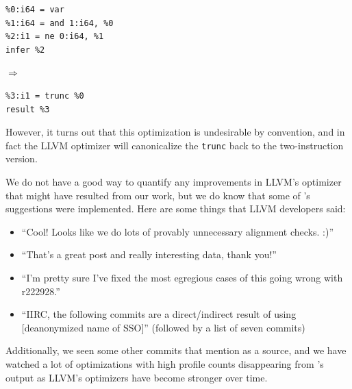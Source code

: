 {\small\begin{verbatim}
%0:i64 = var
%1:i64 = and 1:i64, %0
%2:i1 = ne 0:i64, %1
infer %2
\end{verbatim}}
$\Rightarrow$
{\small\begin{verbatim}
%3:i1 = trunc %0
result %3
\end{verbatim}}

However, it turns out that this optimization is undesirable by
convention, and in fact the LLVM optimizer will canonicalize the
\texttt{trunc} back to the two-instruction version.


We do not have a good way to quantify any improvements in LLVM's
optimizer that might have resulted from our work, but we do know that
some of \tool{}'s suggestions were implemented.
%
Here are some things that LLVM developers said:
\begin{itemize}
\item
  ``Cool! Looks like we do lots of provably unnecessary alignment checks. :)''
\item
  ``That’s a great post and really interesting data, thank you!''
\item
  ``I’m pretty sure I’ve fixed the most egregious cases of this going wrong with r222928.''
\item
  ``IIRC, the following commits are a direct/indirect result of using
  [deanonymized name of SSO]'' (followed by a list of seven commits)
\end{itemize}
%
Additionally, we seen some other commits that mention \tool{} as a
source, and we have watched a lot of optimizations with high profile
counts disappearing from \tool{}'s output as LLVM's optimizers have
become stronger over time.

